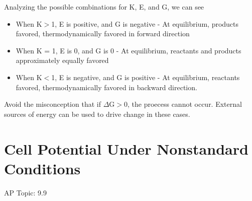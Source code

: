 \documentclass[../chem.tex]{subfiles}
\begin{document}
Analyzing the possible combinations for K, E, and G, we can see 
\begin{itemize}
    \item When K$>$1, E is positive, and G is negative - At equilibrium, products favored, thermodynamically favored in forward direction 
    \item When K = 1, E is 0, and G is 0 - At equilibrium, reactants and products approximately equally favored 
    \item When K$<$1, E is negative, and G is positive - At equilibrium, reactants favored, thermodynamically favored in backward direction.
\end{itemize}

Avoid the misconception that if $\Delta$G$>$0, the proecess cannot occur. External sources of energy can be used to drive change in these cases.
\section{Cell Potential Under Nonstandard Conditions}
AP Topic: 9.9
\end{document}
